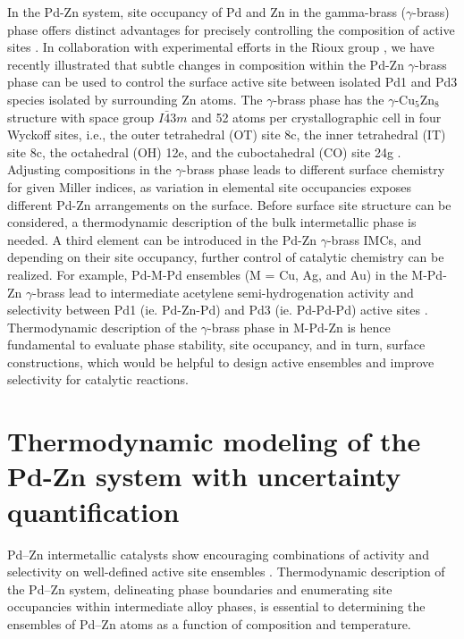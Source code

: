 In the Pd-Zn system, site occupancy of Pd and Zn in the gamma-brass ($\gamma$-brass) phase offers distinct advantages for precisely controlling the composition of active sites \cite{dasgupta2019generalized}. In collaboration with experimental efforts in the Rioux group \cite{Dasgupta2022}, we have recently illustrated that subtle changes in composition within the Pd-Zn $\gamma$-brass phase can be used to control the surface active site between isolated Pd1 and Pd3 species isolated by surrounding Zn atoms. The $\gamma$-brass phase has the $\gamma$-Cu$_5$Zn$_8$ structure with space group $I\bar{4}3m$ and 52 atoms per crystallographic cell in four Wyckoff sites, i.e., the outer tetrahedral (OT) site 8c, the inner tetrahedral (IT) site 8c, the octahedral (OH) 12e, and the cuboctahedral (CO) site 24g \cite{strom1969x}. Adjusting compositions in the $\gamma$-brass phase leads to different surface chemistry for given Miller indices, as variation in elemental site occupancies exposes different Pd-Zn arrangements on the surface. Before surface site structure can be considered, a thermodynamic description of the bulk intermetallic phase is needed. A third element can be introduced in the Pd-Zn $\gamma$-brass IMCs, and depending on their site occupancy, further control of catalytic chemistry can be realized. For example, Pd-M-Pd ensembles (M = Cu, Ag, and Au) in the M-Pd-Zn $\gamma$-brass lead to intermediate acetylene semi-hydrogenation activity and selectivity between Pd1 (ie. Pd-Zn-Pd) and Pd3 (ie. Pd-Pd-Pd) active sites \cite{Dasgupta2022}. Thermodynamic description of the $\gamma$-brass phase in M-Pd-Zn is hence fundamental to evaluate phase stability, site occupancy, and in turn, surface constructions, which would be helpful to design active ensembles and improve selectivity for catalytic reactions. 

\section{Thermodynamic modeling of the Pd-Zn system with uncertainty quantification} \label{intermetallics:sec:PdZn}
Pd–Zn intermetallic catalysts show encouraging combinations of activity and selectivity on well-defined active site ensembles \cite{Dasgupta2022}. Thermodynamic description of the Pd–Zn system, delineating phase boundaries and enumerating site occupancies within intermediate alloy phases, is essential to determining the ensembles of Pd–Zn atoms as a function of composition and temperature. 

